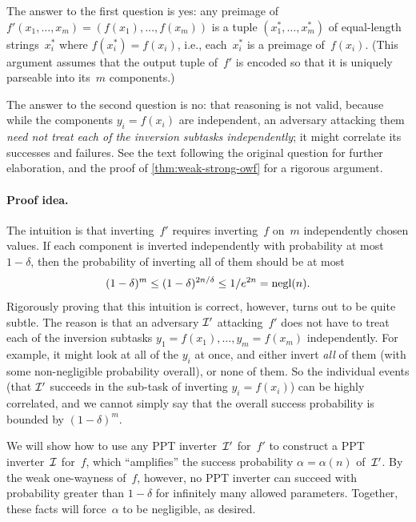 \documentclass[11pt]{article}
\begin{document}
\begin{answer}
  The answer to the first question is yes: any preimage of
  $f'(x_{1}, \ldots, x_{m}) = (f(x_{1}), \ldots, f(x_{m}))$ is a tuple
  $(x_{1}^{*}, \ldots, x_{m}^{*})$ of equal-length strings~$x_{i}^{*}$
  where $f(x_{i}^{*}) = f(x_{i})$, i.e., each~$x_{i}^{*}$ is a
  preimage of~$f(x_{i})$. (This argument assumes that the output
  tuple of~$f'$ is encoded so that it is uniquely parseable into
  its~$m$ components.)

  The answer to the second question is no: that reasoning is not
  valid, because while the components $y_{i} = f(x_{i})$ are
  independent, an adversary attacking them \emph{need not treat each
    of the inversion subtasks independently}; it might correlate its
  successes and failures. See the text following the original question
  for further elaboration, and the proof of
  \cref{thm:weak-strong-owf} for a rigorous argument.
\end{answer}

\paragraph{Proof idea.}

The intuition is that inverting~$f'$ requires inverting~$f$ on~$m$ independently chosen values.
If each component is inverted independently with probability at most $1-\delta$, then the probability of inverting all of them should be at most
\[ (1-\delta)^{m} \leq (1-\delta)^{2n/\delta} \leq 1/e^{2n} = \operatorname{negl}(n)\text. \]
Rigorously proving that this intuition is correct, however, turns out to be quite subtle.
The reason is that an adversary $\mathcal{I}'$ attacking~$f'$ does not have to treat each of the inversion subtasks $y_{1} = f(x_{1}), \ldots, y_{m} = f(x_{m})$ independently.
For example, it might look at all of the $y_{i}$ at once, and either invert \emph{all} of them (with some non-negligible probability overall), or none of them.
So the individual events (that $\mathcal{I}'$ succeeds in the sub-task of inverting $y_{i} = f(x_{i})$) can be highly correlated, and we cannot simply say that the overall success probability is bounded by $(1-\delta)^{m}$.

We will show how to use any PPT inverter~$\mathcal{I}'$ for~$f'$ to construct a PPT inverter~$\mathcal{I}$ for~$f$, which ``amplifies'' the success probability $\alpha=\alpha(n)$ of~$\mathcal{I}'$.
By the weak one-wayness of~$f$, however, no PPT inverter can succeed with probability greater than $1-\delta$ for infinitely many allowed parameters.
Together, these facts will force~$\alpha$ to be negligible, as desired.
\end{document}
